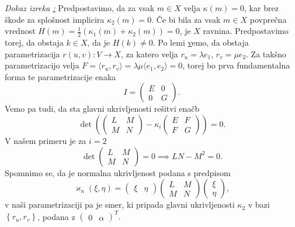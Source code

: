 \noindent
{\em Dokaz izreka \href{izr_plsokev_je_ploscata_ce_je_del_valja_ali_tangentnopremosnosne_ploskve}:\/}
Predpostavimo, da za vsak $m \in X$ velja $\kappa(m) = 0$, kar brez škode za splošnost implicira $\kappa_2(m) = 0$. Če bi bila za vsak $m \in X$ povprečna vrednost $H(m) = \frac{1}{2}(\kappa_1(m) + \kappa_2(m))= 0$, je $X$ ravnina. Predpostavimo torej, da obstaja
$k \in  X$, da je $H(k) \neq 0$.
Po lemi \href{lem_obstoj_funkcij} vemo, da obstaja parametrizacija $r(u,v): V \to X$, za katero velja $r_u = \lambda e_1$, $r_v = \mu e_2$. 
Za takšno parametrizacijo velja $F = \langle r_u, r_v \rangle = \lambda \mu \langle e_1, e_2 \rangle = 0$, torej bo prva fundamentalna forma te parametrizacije enaka \begin{equation*}
I = \begin{pmatrix}
E & 0 \\
0 & G
\end{pmatrix}.
\end{equation*}  
Vemo pa tudi, da sta glavni ukrivljenosti rešitvi enačb \begin{equation*} \det \left( \begin{pmatrix}
  L & M \\
  M & N
  \end{pmatrix} - \kappa_i \begin{pmatrix}
  E & F \\
  F & G
  \end{pmatrix}  \right) = 0. \end{equation*}
V našem primeru je za $i = 2$ \begin{equation*}
  \det  \begin{pmatrix}
    L & M \\
    M & N
    \end{pmatrix} = 0 \implies LN - M^2 = 0.
\end{equation*}  
Spomnimo se, da je normalna ukrivljenost podana s predpisom \begin{equation*}
\varkappa_n(\xi, \eta) = \begin{pmatrix}
    \xi & \eta
\end{pmatrix} \begin{pmatrix}
L & M \\
M & N
\end{pmatrix} \begin{pmatrix}
  \xi \\ \eta
\end{pmatrix},
\end{equation*}  
v naši parametrizaciji pa je smer, ki pripada glavni ukrivljenosti $\kappa_2$ v bazi $\left\{ r_u, r_v\right\}$, podana z $\begin{pmatrix}
    0 & \alpha
\end{pmatrix}^{T}.$

